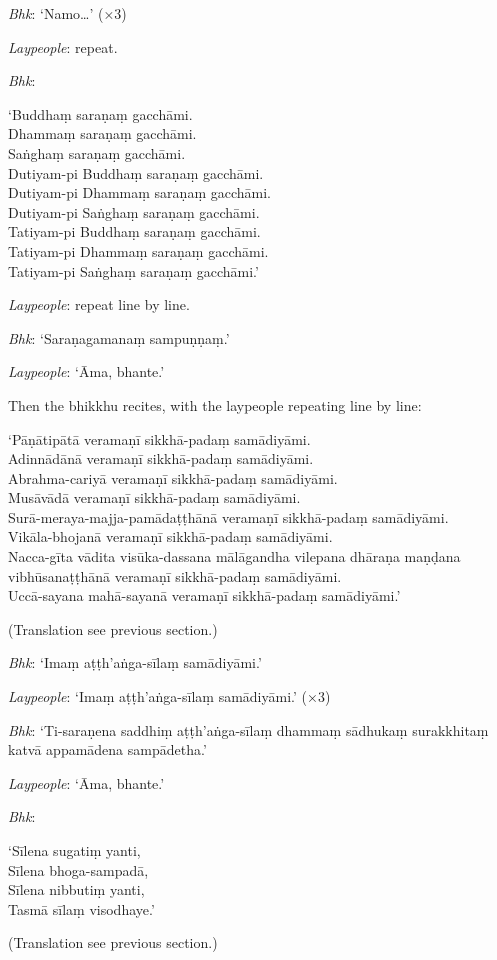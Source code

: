 \emph{Bhk}: ‘Namo…’ (×3)

\emph{Laypeople}: repeat.

\emph{Bhk}:

‘Buddhaṃ saraṇaṃ gacchāmi.\\
Dhammaṃ saraṇaṃ gacchāmi.\\
Saṅghaṃ saraṇaṃ gacchāmi.\\
Dutiyam-pi Buddhaṃ saraṇaṃ gacchāmi.\\
Dutiyam-pi Dhammaṃ saraṇaṃ gacchāmi.\\
Dutiyam-pi Saṅghaṃ saraṇaṃ gacchāmi.\\
Tatiyam-pi Buddhaṃ saraṇaṃ gacchāmi.\\
Tatiyam-pi Dhammaṃ saraṇaṃ gacchāmi.\\
Tatiyam-pi Saṅghaṃ saraṇaṃ gacchāmi.’

\emph{Laypeople}: repeat line by line.

\emph{Bhk}: ‘Saraṇagamanaṃ sampuṇṇaṃ.’

\emph{Laypeople}: ‘Āma, bhante.’

Then the bhikkhu recites, with the laypeople repeating line by line:

‘Pāṇātipātā veramaṇī sikkhā-padaṃ samādiyāmi.\\
Adinnādānā veramaṇī sikkhā-padaṃ samādiyāmi.\\
Abrahma-cariyā veramaṇī sikkhā-padaṃ samādiyāmi.\\
Musāvādā veramaṇī sikkhā-padaṃ samādiyāmi.\\
Surā-meraya-majja-pamādaṭṭhānā veramaṇī sikkhā-padaṃ samādiyāmi.\\
Vikāla-bhojanā veramaṇī sikkhā-padaṃ samādiyāmi.\\
Nacca-gīta vādita visūka-dassana mālāgandha vilepana dhāraṇa maṇḍana
vibhūsanaṭṭhānā veramaṇī sikkhā-padaṃ samādiyāmi.\\
Uccā-sayana mahā-sayanā veramaṇī sikkhā-padaṃ samādiyāmi.’


(Translation see previous section.)

\emph{Bhk}: ‘Imaṃ aṭṭh'aṅga-sīlaṃ samādiyāmi.’

\emph{Laypeople}: ‘Imaṃ aṭṭh'aṅga-sīlaṃ samādiyāmi.’ (×3)

\emph{Bhk}: ‘Ti-saraṇena saddhiṃ aṭṭh'aṅga-sīlaṃ dhammaṃ sādhukaṃ surakkhitaṃ
katvā appamādena sampādetha.’

\emph{Laypeople}: ‘Āma, bhante.’

\emph{Bhk}:

‘Sīlena sugatiṃ yanti,\\
Sīlena bhoga-sampadā,\\
Sīlena nibbutiṃ yanti,\\
Tasmā sīlaṃ visodhaye.’

(Translation see previous section.)


